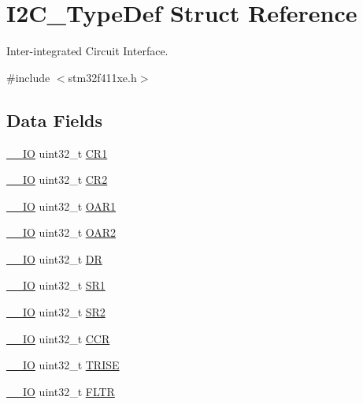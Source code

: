 \hypertarget{struct_i2_c___type_def}{}\section{I2\+C\+\_\+\+Type\+Def Struct Reference}
\label{struct_i2_c___type_def}


Inter-\/integrated Circuit Interface.  




{\ttfamily \#include $<$stm32f411xe.\+h$>$}

\subsection*{Data Fields}
\begin{DoxyCompactItemize}
\item 
\hyperlink{core__sc300_8h_aec43007d9998a0a0e01faede4133d6be}{\+\_\+\+\_\+\+IO} uint32\+\_\+t \hyperlink{struct_i2_c___type_def_a91782f7b81475b0e3c3779273abd26aa}{C\+R1}
\item 
\hyperlink{core__sc300_8h_aec43007d9998a0a0e01faede4133d6be}{\+\_\+\+\_\+\+IO} uint32\+\_\+t \hyperlink{struct_i2_c___type_def_a29eb47db03d5ad7e9b399f8895f1768c}{C\+R2}
\item 
\hyperlink{core__sc300_8h_aec43007d9998a0a0e01faede4133d6be}{\+\_\+\+\_\+\+IO} uint32\+\_\+t \hyperlink{struct_i2_c___type_def_ae8269169fcbdc2ecb580208d99c2f89f}{O\+A\+R1}
\item 
\hyperlink{core__sc300_8h_aec43007d9998a0a0e01faede4133d6be}{\+\_\+\+\_\+\+IO} uint32\+\_\+t \hyperlink{struct_i2_c___type_def_a73988a218be320999c74a641b3d6e3c1}{O\+A\+R2}
\item 
\hyperlink{core__sc300_8h_aec43007d9998a0a0e01faede4133d6be}{\+\_\+\+\_\+\+IO} uint32\+\_\+t \hyperlink{struct_i2_c___type_def_a5c1beaa4935359da1c8f0ceb287f90be}{DR}
\item 
\hyperlink{core__sc300_8h_aec43007d9998a0a0e01faede4133d6be}{\+\_\+\+\_\+\+IO} uint32\+\_\+t \hyperlink{struct_i2_c___type_def_a639be124227c03bb3f5fe0e7faf84995}{S\+R1}
\item 
\hyperlink{core__sc300_8h_aec43007d9998a0a0e01faede4133d6be}{\+\_\+\+\_\+\+IO} uint32\+\_\+t \hyperlink{struct_i2_c___type_def_ac509048af4b9ac67c808d584fdbc712e}{S\+R2}
\item 
\hyperlink{core__sc300_8h_aec43007d9998a0a0e01faede4133d6be}{\+\_\+\+\_\+\+IO} uint32\+\_\+t \hyperlink{struct_i2_c___type_def_a4d81b61d23a54d0d1e28646c3bb9aac5}{C\+CR}
\item 
\hyperlink{core__sc300_8h_aec43007d9998a0a0e01faede4133d6be}{\+\_\+\+\_\+\+IO} uint32\+\_\+t \hyperlink{struct_i2_c___type_def_a9f1a5aee4a26b2fb30e08f88586c436d}{T\+R\+I\+SE}
\item 
\hyperlink{core__sc300_8h_aec43007d9998a0a0e01faede4133d6be}{\+\_\+\+\_\+\+IO} uint32\+\_\+t \hyperlink{struct_i2_c___type_def_a6b540b18ea0370e3e45f69902343320c}{F\+L\+TR}
\end{DoxyCompactItemize}


